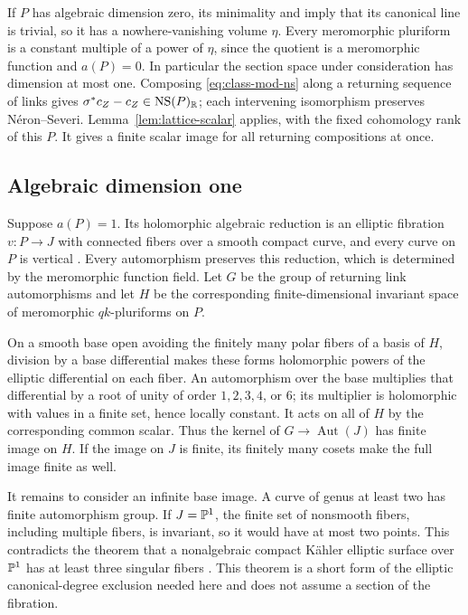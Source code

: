 If \(P\) has algebraic dimension zero, its minimality and
\cite[Theorem~4]{KodairaCompactAnalytic} imply that its canonical line
is trivial, so it has a nowhere-vanishing
volume \(\eta\).  Every meromorphic pluriform is
a constant multiple of a power of \(\eta\), since the quotient is a
meromorphic function and \(a(P)=0\).  In particular the section space
under consideration has dimension at most one.  Composing
\eqref{eq:class-mod-ns} along a returning sequence of links gives
\(\sigma^*c_Z-c_Z\in\operatorname{NS}(P)_\mathbb R\); each intervening isomorphism preserves
N\'eron--Severi.  Lemma~\ref{lem:lattice-scalar} applies, with the fixed
cohomology rank of this \(P\).  It gives a finite scalar image for all
returning compositions at once.

\subsection{Algebraic dimension one}

Suppose \(a(P)=1\).  Its holomorphic algebraic reduction is an elliptic
fibration \(v:P\to J\) with connected fibers over a smooth compact curve,
and every curve on \(P\) is vertical
\cite[Theorem~2]{KodairaCompactAnalytic}.  Every automorphism preserves
this reduction, which is determined by the meromorphic function field.
Let \(G\) be the group of returning link automorphisms and let \(H\) be
the corresponding finite-dimensional invariant space of meromorphic
\(qk\)-pluriforms on \(P\).

On a smooth base open avoiding the finitely many polar fibers of a basis
of \(H\), division by a base differential makes these forms holomorphic
powers of the elliptic differential on each fiber.  An automorphism over
the base multiplies that differential by a root of unity of order
\(1,2,3,4\), or \(6\); its multiplier is holomorphic with values in a
finite set, hence locally constant.  It acts on all of \(H\) by the
corresponding common scalar.  Thus the kernel of \(G\to\operatorname{Aut}(J)\)
has finite image on \(H\).  If the image on \(J\) is finite, its finitely
many cosets make the full image finite as well.

It remains to consider an infinite base image.  A curve of genus at
least two has finite automorphism group.  If \(J=\mathbb P^1\), the finite set
of nonsmooth fibers, including multiple fibers, is invariant, so it would
have at most two points.  This contradicts the theorem that a nonalgebraic compact
K\"ahler elliptic surface over \(\mathbb P^1\) has at least three singular
fibers \cite[Proposition~A.1]{ClaudonHoeringLin2019}.  This theorem is a
short form of the elliptic canonical-degree exclusion needed here and
does not assume a section of the fibration.


